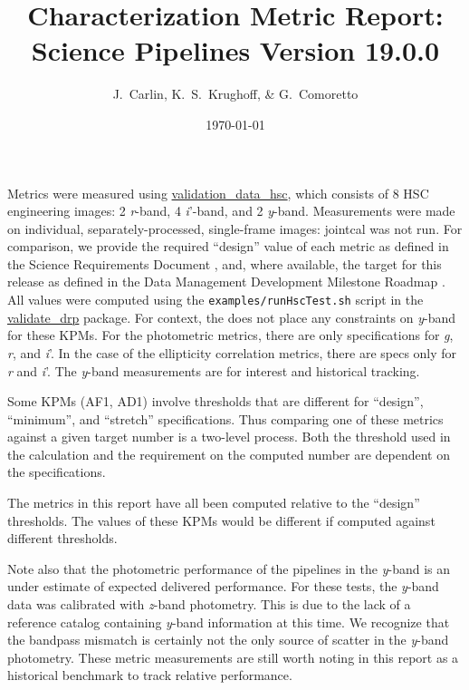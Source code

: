 \documentclass[DM,lsstdraft,toc]{lsstdoc}
\title[V19.0.0 Characterization Report]{Characterization Metric Report: Science Pipelines Version 19.0.0}
\author{J.~Carlin, K.~S.~Krughoff, \& G.~Comoretto}
\date{\today}
\begin{document}

\maketitle

Metrics were measured using \href{https://github.com/lsst/validation_data_hsc}{validation\_data\_hsc}, which consists of 8 HSC engineering images: 2 \emph{r}-band, 4 \emph{i}'-band, and 2 \emph{y}-band. Measurements were made on individual, separately-processed, single-frame images: jointcal was not run. For comparison, we provide the \SRD required ``design'' value of each metric as defined in the Science Requirements Document , and, where available, the target for this release as defined in the Data Management Development Milestone Roadmap . All values were computed using the \texttt{examples/runHscTest.sh} script in the \href{https://github.com/lsst/validate_drp}{validate\_drp} package. For context, the \SRD does not place any constraints on \emph{y}-band for these KPMs.  For the photometric metrics, there are only specifications for \emph{g}, \emph{r}, and \emph{i}'. In the case of the ellipticity correlation metrics, there are specs only for \emph{r} and \emph{i}'. The \emph{y}-band measurements are for interest and historical tracking.

Some KPMs (AF1, AD1) involve thresholds that are different for ``design'', ``minimum'', and ``stretch'' specifications. Thus comparing one of these metrics against a given target number is a two-level process. Both the threshold used in the calculation and the requirement on the computed number are dependent on the specifications.

The metrics in this report have all been computed relative to the ``design'' thresholds. The values of these KPMs would be different if computed against different thresholds.

Note also that the photometric performance of the pipelines in the \emph{y}-band is an under estimate of expected delivered performance.  For these tests, the \emph{y}-band data was calibrated with \emph{z}-band photometry.  This is due to the lack of a reference catalog containing \emph{y}-band information at this time. We recognize that the bandpass mismatch is certainly not the only source of scatter in the \emph{y}-band photometry. These metric measurements are still worth noting in this report as a historical benchmark to track relative performance.
\end{document}
